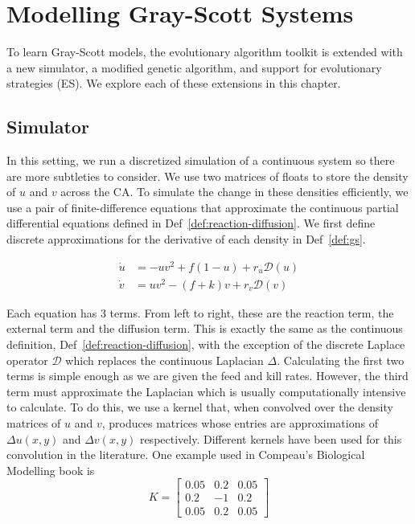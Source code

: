 \chapter{Modelling Gray-Scott Systems} \label{gray-scott}

To learn Gray-Scott models, the evolutionary algorithm toolkit is extended with a new simulator, a modified genetic algorithm, and support for evolutionary strategies (ES). We explore each of these extensions in this chapter.

\section{Simulator} \label{sec:simulator-2}

In this setting, we run a discretized simulation of a continuous system so there are more subtleties to consider. We use two matrices of floats to store the density of $u$ and $v$ across the CA. To simulate the change in these densities efficiently, we use a pair of finite-difference equations that approximate the continuous partial differential equations defined in Def~\ref{def:reaction-diffusion}. We first define discrete approximations for the derivative of each density in Def~\ref{def:gs}.
\begin{definition}\label{def:gs}
\begin{align}
  \dot{u} &= -uv^2 + f(1-u) + r_u \mathcal{D}(u)\\
  \dot{v} &= uv^2 - (f+k)v + r_v \mathcal{D}(v)
\end{align}
\end{definition}
Each equation has 3 terms. From left to right, these are the reaction term, the external term and the diffusion term. This is exactly the same as the continuous definition, Def~\ref{def:reaction-diffusion}, with the exception of the discrete Laplace operator $\mathcal{D}$ which replaces the continuous Laplacian $\Delta$. Calculating the first two terms is simple enough as we are given the feed and kill rates.  However, the third term must approximate the Laplacian which is usually computationally intensive to calculate. To do this, we use a kernel that, when convolved over the density matrices of $u$ and $v$, produces matrices whose entries are approximations of $\Delta u(x,y)$ and $\Delta v(x,y)$ respectively. Different kernels have been used for this convolution in the literature. One example used in Compeau's Biological Modelling book\cite{compeau} is
\begin{equation}
  K= \begin{bmatrix}
    0.05 & 0.2 & 0.05\\
    0.2 & -1 & 0.2\\
    0.05 & 0.2 & 0.05
  \end{bmatrix}
\end{equation}
